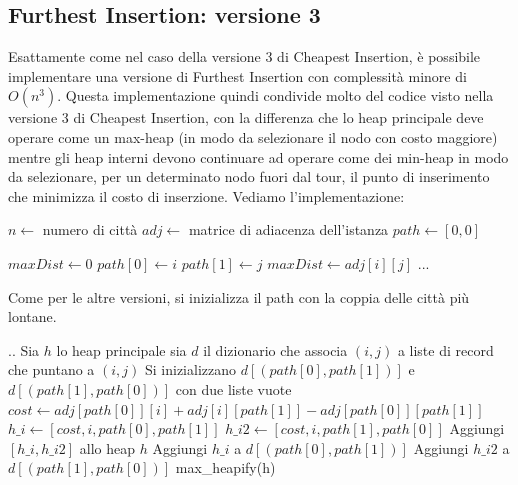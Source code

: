 \documentclass[a4paper,12pt]{report}
\begin{document}
\subsection{Furthest Insertion: versione 3}
Esattamente come nel caso della versione 3 di Cheapest Insertion, è possibile implementare una versione di Furthest Insertion con complessità minore di $O(n^3)$. Questa implementazione quindi condivide molto del codice visto nella versione 3 di Cheapest Insertion, con la differenza che lo heap principale deve operare come un max-heap (in modo da selezionare il nodo con costo maggiore) mentre gli heap interni devono continuare ad operare come dei min-heap in modo da selezionare, per un determinato nodo fuori dal tour, il punto di inserimento che minimizza il costo di inserzione. Vediamo l'implementazione:
\begin{tcolorbox}[colframe=black, colback=white, boxrule=0.5pt, title=Furthest Insertion Versione 3, coltitle=black, fonttitle=\bfseries, colbacktitle=white, breakable]
  \begin{algorithmic}[1]
    \State $n \gets$ numero di città
    \State $adj \gets$ matrice di adiacenza dell'istanza
    \State $path \gets [0, 0]$
    
    \State $maxDist \gets 0$
          \State $path[0] \gets i$
          \State $path[1] \gets j$
          \State $maxDist \gets adj[i][j]$
        \EndIf
      \EndFor
    \EndFor
    \State ...
  \end{algorithmic}
\end{tcolorbox}
Come per le altre versioni, si inizializza il path con la coppia delle città più lontane.
\begin{tcolorbox}[colframe=black, colback=white, boxrule=0.5pt, title=Cheapest Insertion Versione 3, coltitle=black, fonttitle=\bfseries, colbacktitle=white, breakable]
  \begin{algorithmic}[1]
    \State ..
    \State Sia $h$ lo heap principale
    \State sia $d$ il dizionario che associa $(i, j)$ a liste di record che puntano a $(i, j)$
    \State Si inizializzano $d[(path[0], path[1])]$ e $d[(path[1], path[0])]$ con due liste vuote
      \State $cost \gets adj[path[0]][i] + adj[i][path[1]] - adj[path[0]][path[1]]$
      \State $h\_i \gets [cost, i, path[0], path[1]]$
      \State $h\_i2 \gets [cost, i, path[1], path[0]]$
      \State Aggiungi $[h\_i, h\_i2]$ allo heap $h$
      \State Aggiungi $h\_i$ a $d[(path[0], path[1])]$
      \State Aggiungi $h\_i2$ a $d[(path[1], path[0])]$
    \EndFor
    \State max\_heapify(h)
  \end{algorithmic}
\end{tcolorbox}
\end{document}
